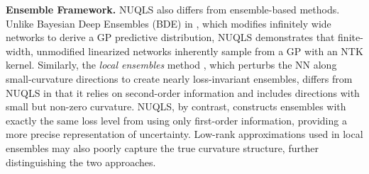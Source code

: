 \noindent
\textbf{Ensemble Framework.} NUQLS also differs from ensemble-based methods. Unlike Bayesian Deep Ensembles (BDE) in \cite{he2020bayesian}, which modifies infinitely wide networks to derive a GP predictive distribution, NUQLS demonstrates that finite-width, unmodified linearized networks inherently sample from a GP with an NTK kernel.  Similarly, the \textit{local ensembles} method \cite{madras2019detecting}, which perturbs the NN along small-curvature directions to create nearly loss-invariant ensembles, differs from NUQLS in that it relies on second-order information and includes directions with small but non-zero curvature. NUQLS, by contrast, constructs ensembles with exactly the same loss level from using only first-order information, providing a more precise representation of uncertainty. Low-rank approximations used in local ensembles may also poorly capture the true curvature structure, further distinguishing the two approaches.


